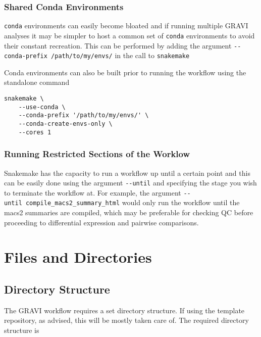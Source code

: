 \documentclass[
]{book}
\begin{document}
\hypertarget{shared-conda-environments}{%
\subsection{Shared Conda Environments}\label{shared-conda-environments}}

\texttt{conda} environments can easily become bloated and if running multiple GRAVI analyses it may be simpler to host a common set of \texttt{conda} environments to avoid their constant recreation.
This can be performed by adding the argument \texttt{-\/-conda-prefix\ \textquotesingle{}/path/to/my/envs/\textquotesingle{}} in the call to \texttt{snakemake}

Conda environments can also be built prior to running the workflow using the standalone command

\begin{verbatim}
snakemake \
    --use-conda \
    --conda-prefix '/path/to/my/envs/' \
    --conda-create-envs-only \
    --cores 1
\end{verbatim}

\hypertarget{running-restricted-sections-of-the-worklow}{%
\subsection{Running Restricted Sections of the Worklow}\label{running-restricted-sections-of-the-worklow}}

Snakemake has the capacity to run a workflow up until a certain point and this can be easily done using the argument \texttt{-\/-until} and specifying the stage you wish to terminate the workflow at. For example, the argument \texttt{-\/-until\ compile\_macs2\_summary\_html} would only run the workflow until the macs2 summaries are compiled, which may be preferable for checking QC before proceeding to differential expression and pairwise comparisons.

\hypertarget{input-files}{%
\chapter{Files and Directories}\label{input-files}}

\hypertarget{directories}{%
\section{Directory Structure}\label{directories}}

The GRAVI workflow requires a set directory structure.
If using the template repository, as advised, this will be mostly taken care of.
The required directory structure is
\end{document}
